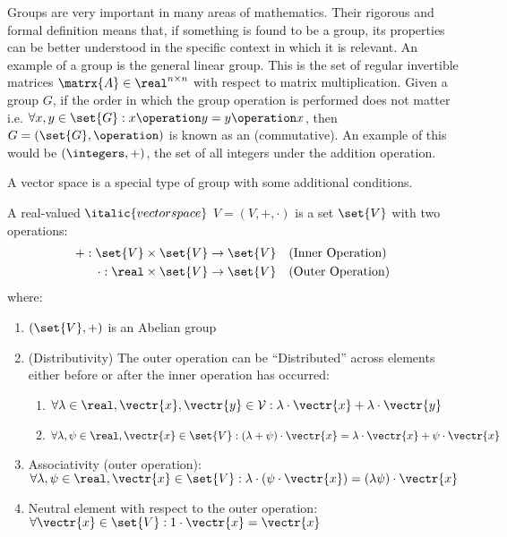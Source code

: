 Groups are very important in many areas of mathematics. Their rigorous and formal definition means that, if something is found to be a group, its properties can be better understood in the specific context in which it is relevant.
An example of a group is the general linear group. This is the set of regular invertible matrices $ \matrx{A} \in \real^{n \times n} $ with respect to matrix multiplication.
Given a group $ G $, if the order in which the group operation is performed does not matter i.e. $ \forall x, y \in \set{G} : x \operation y = y \operation x $, then $ G = (\set{G}, \operation) $ is known as an  (commutative). An example of this would be $ (\integers, +) $, the set of all integers under the addition operation.

A vector space \cite{mml_vector_space_37} is a special type of group with some additional conditions. 

\begin{definition}
	\normalfont A real-valued $\italic{vector space}$ $V = (V, +, \cdot)$ is a set $\set{V}$ with two operations:
	\begin{align}
		+: \set{V} &\times \set{V} \rightarrow \set{V} \hspace{10pt} (\text{Inner Operation}) \\
		\cdot: \real &\times \set{V} \rightarrow \set{V} \hspace{10pt} (\text{Outer Operation})
	\end{align}
	where:
	\begin{enumerate}
		\item $(\set{V}, +)$ is an Abelian group
		\item (Distributivity) The outer operation can be ``Distributed'' across elements either before or after the inner operation has occurred: 
		\begin{enumerate}
			\item $\forall \lambda \in \real, \vectr{x}, \vectr{y} \in \mathcal{V}: \lambda \cdot \vectr{x} + \lambda \cdot \vectr{y}$
			\item $\forall \lambda, \psi \in \real, \vectr{x} \in \set{V}: (\lambda + \psi) \cdot \vectr{x} = \lambda \cdot \vectr{x} + \psi \cdot \vectr{x}$
		\end{enumerate} 
		\item Associativity (outer operation): $\forall \lambda, \psi \in \real, \vectr{x} \in \set{V}: \lambda \cdot (\psi \cdot \vectr{x}) = (\lambda \psi) \cdot \vectr{x}$
		\item Neutral element with respect to the outer operation: $\forall \vectr{x} \in \set{V}: 1 \cdot \vectr{x} = \vectr{x}$
	\end{enumerate}
\end{definition}

